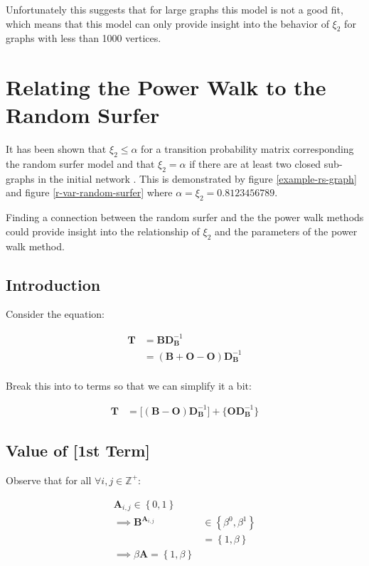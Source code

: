 \documentclass[11pt]{report}
\begin{document}
Unfortunately this suggests that for large graphs this model is not a good fit,
which means that this model can only provide insight into the behavior of
\(\xi_{2}\) for graphs with less than 1000 vertices.

\section{Relating the Power Walk to the Random Surfer}
\label{relate-to-random-surfer}
It has been shown that \(\xi_{2} \leq \alpha\) for a transition probability matrix corresponding the random surfer model and that \(\xi_{2} = \alpha\) if there are at least two closed sub-graphs in the initial network \cite{haveliwalaSecondEigenvalueGoogle2003}. This is demonstrated by figure \ref{example-rs-graph} and figure \ref{r-var-random-surfer} where \(\alpha = \xi_{2} = 0.8123456789\).

Finding a connection between the random surfer and the the power walk methods could provide insight into the relationship of \(\xi_{2}\) and the parameters of the power walk method.

\subsection{Introduction}
\label{sec:org07b66b7}
Consider the equation:


\begin{align*}
\mathbf{T}&= \mathbf{B}\mathbf{D}_{\mathbf{B}}^{- 1} \\
&= \left( \mathbf{B}+  \mathbf{O} - \mathbf{O} \right) \mathbf{D}_{\mathbf{B}}^{- 1} \\
\end{align*}


Break this into to terms so that we can simplify it a bit:


\begin{align*}
    \mathbf{T} &= \Bigg[ \left( \mathbf{B}- \mathbf{O} \right)\mathbf{D}_{\mathbf{B}}^{- 1} \Bigg] + \Bigg\{  \mathbf{O}\mathbf{D}_{\mathbf{B}}^{- 1} \Bigg\}
\end{align*}
\subsection{Value of [1st Term]}
\label{value-of-1st-term}
Observe that for all \(\forall i,j\in \mathbb{Z}^+\):


\begin{align*}
\mathbf{A}_{i, j} \in \left\{0, 1\right\} \\
\implies  \mathbf{B}^{\mathbf{A}_{i, j}} &\in \left\{\beta^0, \beta^1\right\} \\
                     &= \left\{1, \beta \right\}  \\
                      \implies  \beta \mathbf{A} = \left\{1, \beta \right\}
\end{align*}
\end{document}
